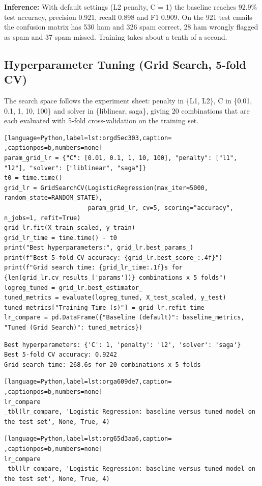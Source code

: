 \documentclass[11pt]{article}
\begin{document}
\textbf{Inference:} With default settings (L2 penalty, C = 1) the baseline reaches 92.9\% test accuracy,
precision 0.921, recall 0.898 and F1 0.909. On the 921 test emails the confusion matrix has
530 ham and 326 spam correct, 28 ham wrongly flagged as spam and 37 spam missed. Training
takes about a tenth of a second.

\subsection*{Hyperparameter Tuning (Grid Search, 5-fold CV)}
\label{sec:org315e031}


The search space follows the experiment sheet: penalty in \{L1, L2\}, C in \{0.01, 0.1, 1, 10,
100\} and solver in \{liblinear, saga\}, giving 20 combinations that are each evaluated with
5-fold cross-validation on the training set.
\begin{lstlisting}[language=Python,label=lst:orgd5ec303,caption= ,captionpos=b,numbers=none]
param_grid_lr = {"C": [0.01, 0.1, 1, 10, 100], "penalty": ["l1", "l2"], "solver": ["liblinear", "saga"]}
t0 = time.time()
grid_lr = GridSearchCV(LogisticRegression(max_iter=5000, random_state=RANDOM_STATE),
                       param_grid_lr, cv=5, scoring="accuracy", n_jobs=1, refit=True)
grid_lr.fit(X_train_scaled, y_train)
grid_lr_time = time.time() - t0
print("Best hyperparameters:", grid_lr.best_params_)
print(f"Best 5-fold CV accuracy: {grid_lr.best_score_:.4f}")
print(f"Grid search time: {grid_lr_time:.1f}s for {len(grid_lr.cv_results_['params'])} combinations x 5 folds")
logreg_tuned = grid_lr.best_estimator_
tuned_metrics = evaluate(logreg_tuned, X_test_scaled, y_test)
tuned_metrics["Training Time (s)"] = grid_lr.refit_time_
lr_compare = pd.DataFrame({"Baseline (default)": baseline_metrics, "Tuned (Grid Search)": tuned_metrics})
\end{lstlisting}

\begin{verbatim}
Best hyperparameters: {'C': 1, 'penalty': 'l2', 'solver': 'saga'}
Best 5-fold CV accuracy: 0.9242
Grid search time: 268.6s for 20 combinations x 5 folds
\end{verbatim}

\begin{lstlisting}[language=Python,label=lst:orga609de7,caption= ,captionpos=b,numbers=none]
lr_compare
_tbl(lr_compare, 'Logistic Regression: baseline versus tuned model on the test set', None, True, 4)
\end{lstlisting}
\begin{lstlisting}[language=Python,label=lst:org65d3aa6,caption= ,captionpos=b,numbers=none]
lr_compare
_tbl(lr_compare, 'Logistic Regression: baseline versus tuned model on the test set', None, True, 4)
\end{lstlisting}
\end{document}
